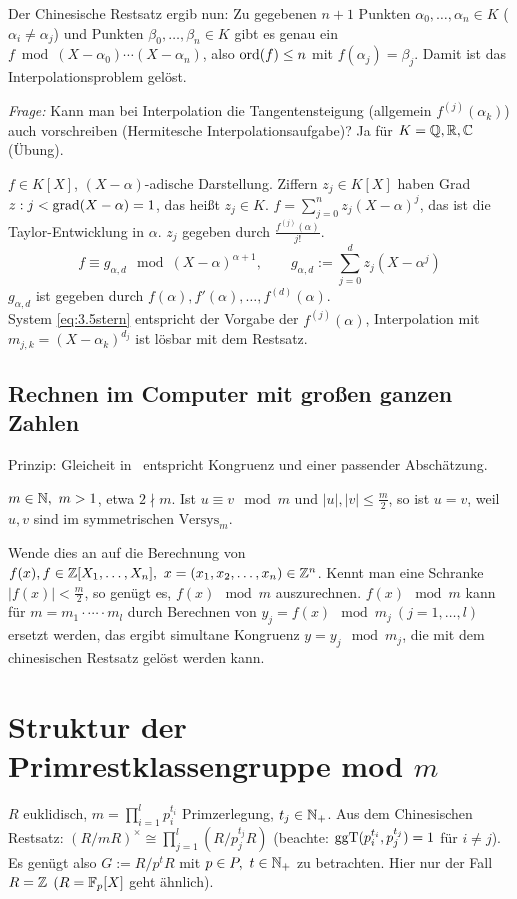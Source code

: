 \documentclass[a4paper,DIV15,BCOR12mm]{article}
\begin{document}
Der Chinesische Restsatz ergib nun: Zu gegebenen $n+1$ Punkten
$\alpha_0, \ldots, \alpha_n \in K$ ($\alpha_i \ne \alpha_j$) und
Punkten $\beta_0, \ldots, \beta_n\in K$ gibt es genau ein $f \bmod
(X-\alpha_0)\cdots(X-\alpha_n)$, also $\mathop{\rm ord}\nolimits(f) \le n$ mit
$f(\alpha_j) = \beta_j$. Damit ist das Interpolationsproblem gelöst.


\emph{Frage:} Kann man bei Interpolation die Tangentensteigung
(allgemein $f^{(j)}(\alpha_k)$) auch vorschreiben (Hermitesche
Interpolationsaufgabe)? Ja für $K=\mathbb{Q}, \mathbb{R}, \mathbb{C}$ (Übung).

$f\in K[X]$, $(X-\alpha)$-adische Darstellung. Ziffern $z_j \in
K[X]$ haben Grad $z:j < \mathop{\rm grad}\nolimits (X-\alpha)=1$, das heißt $z_j \in K$.
$f=\sum_{j=0}^n z_j (X-\alpha)^j$, das ist die Taylor-Entwicklung in
$\alpha$. $z_j$ gegeben durch $\frac{f^{(j)}(\alpha)}{j!}$.
\begin{equation}\label{eq:3.5stern}
    f \equiv g_{\alpha,d} \mod (X-\alpha)^{\alpha+1}, \qquad
    g_{\alpha,d}:=\sum_{j=0}^d z_j(X-\alpha^j)
\end{equation}
$g_{\alpha,d}$ ist gegeben durch
$f(\alpha),f'(\alpha),\dotsc,f^{(d)}(\alpha)$.\\System
\eqref{eq:3.5stern} entspricht der Vorgabe der $f^{(j)}(\alpha)$,
Interpolation mit $m_{j,k}=(X-\alpha_k)^{d_j}$ ist lösbar mit dem
Restsatz.

\subsection{Rechnen im Computer mit großen ganzen Zahlen}

Prinzip: Gleicheit in \MdZ\ entspricht Kongruenz und einer passender
Abschätzung.
\begin{bemerkung}
    $m\in\mathbb{N},\ m>1$, etwa $2 \nmid m$. Ist $u \equiv v \mod m$ und
    $|u|,|v|\leq \frac{m}{2}$, so ist $u=v$, weil $u,v$ sind im
    symmetrischen $\text{Versys}_m$.
\end{bemerkung}
Wende dies an auf die Berechnung von $f(x), f\in
\mathbb{Z}[X_1,\dotsc,X_n],\ x=(x_1,x_2,\dotsc,x_n) \in \mathbb{Z}^n$. Kennt man
eine Schranke $|f(x)|<\frac{m}{2}$, so genügt es, $f(x) \mod m$
auszurechnen. $f(x) \mod m$ kann für $m=m_1 \cdot \dotsb \cdot m_l$
durch Berechnen von $y_j=f(x) \mod m_j\ (j=1,\dotsc,l)$ ersetzt
werden, das ergibt simultane Kongruenz $y=y_j \mod m_j$, die mit dem
chinesischen Restsatz gelöst werden kann.

\section{Struktur der Primrestklassengruppe mod $m$}
$R$ euklidisch, $m=\prod_{i=1}^l p_i^{t_i}$ Primzerlegung, $t_j \in
\mathbb{N}_+$. Aus dem Chinesischen Restsatz: $(R/mR)^{\times} \cong
\prod_{j=1}^l (R/p_j^{t_j} R)$ (beachte:
$\mathop{\rm ggT}\nolimits(p_i^{t_i},p_j^{t_j})=1$ für $i \neq j$). Es genügt also
$G:=R/p^t R$ mit $p\in P,\ t\in \mathbb{N}_+$ zu betrachten. Hier nur der
Fall $R=\mathbb{Z}$ $(R=\mathbb{F}_p[X ]$ geht ähnlich).
\end{document}
